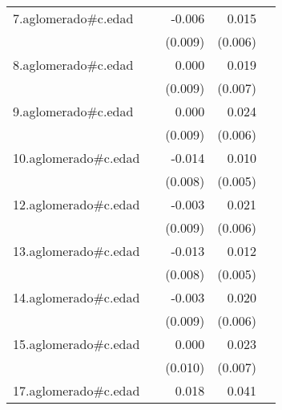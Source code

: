 {\begin{longtable}{l*{4}{D{.}{.}{-1}}}
\addlinespace
7.aglomerado#c.edad&                     &      -0.006         &       0.015\sym{**} &                     \\
            &                     &     (0.009)         &     (0.006)         &                     \\
\addlinespace
8.aglomerado#c.edad&                     &       0.000         &       0.019\sym{**} &                     \\
            &                     &     (0.009)         &     (0.007)         &                     \\
\addlinespace
9.aglomerado#c.edad&                     &       0.000         &       0.024\sym{***}&                     \\
            &                     &     (0.009)         &     (0.006)         &                     \\
\addlinespace
10.aglomerado#c.edad&                     &      -0.014         &       0.010         &                     \\
            &                     &     (0.008)         &     (0.005)         &                     \\
\addlinespace
12.aglomerado#c.edad&                     &      -0.003         &       0.021\sym{**} &                     \\
            &                     &     (0.009)         &     (0.006)         &                     \\
\addlinespace
13.aglomerado#c.edad&                     &      -0.013         &       0.012\sym{**} &                     \\
            &                     &     (0.008)         &     (0.005)         &                     \\
\addlinespace
14.aglomerado#c.edad&                     &      -0.003         &       0.020\sym{**} &                     \\
            &                     &     (0.009)         &     (0.006)         &                     \\
\addlinespace
15.aglomerado#c.edad&                     &       0.000         &       0.023\sym{**} &                     \\
            &                     &     (0.010)         &     (0.007)         &                     \\
\addlinespace
17.aglomerado#c.edad&                     &       0.018         &       0.041\sym{***}&                     \\

\end{longtable}}
